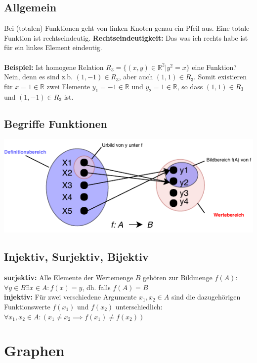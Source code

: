 \documentclass[8pt,landscape]{scrartcl}
\begin{document}
\begin{multicols}{3}
\subsection{Allgemein}
Bei (totalen) Funktionen geht von linken Knoten genau ein Pfeil aus.
Eine totale Funktion ist rechtseindeutig.
\textbf{Rechtseindeutigkeit:} Das was ich rechts habe ist für ein linkes Element eindeutig.\\\\
\textbf{Beispiel:} Ist homogene Relation $R_3 = \{ (x, y) \in \mathbb{R}^2 | y^2 = x \}$ eine Funktion?\\
Nein, denn es sind z.b. $(1, -1) \in R_3$, aber auch $(1, 1) \in R_3$.
Somit existieren f\"ur $x=1 \in \mathbb{R}$ zwei Elemente $y_1 = -1 \in \mathbb{R}$ und $y_2 = 1 \in \mathbb{R}$, so dass $(1, 1) \in R_3$ und $(1, -1) \in R_3$ ist.

\subsection{Begriffe Funktionen}
\includegraphics[width=0.95\linewidth]{./begriffe_funktionen.pdf}



\subsection{Injektiv, Surjektiv, Bijektiv}
\textbf{surjektiv:} Alle Elemente der Wertemenge $B$ gehören zur Bildmenge $f(A)$:\\
$\forall y \in B \exists x \in A : f(x) = y$, dh. falls $f(A) = B$\\
\textbf{injektiv:} F\"ur zwei verschiedene Argumente $x_1, x_2 \in A$ sind die dazugeh\"origen Funktionswerte $f(x_1)$ und $f(x_2)$ unterschiedlich:\\
$\forall x_1, x_2 \in A : (x_1 \not = x_2 \implies f(x_1) \not = f(x_2))$


\section{Graphen}

\end{multicols}
\end{document}
